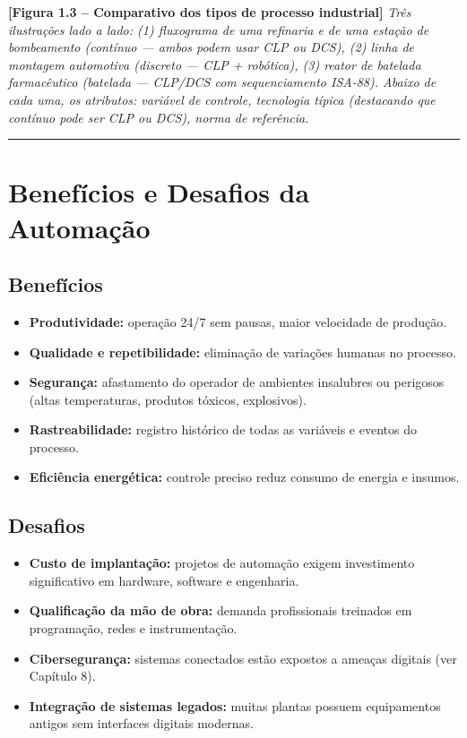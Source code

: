 \begin{caixafigura}

\textbf{{[}Figura 1.3 -- Comparativo dos tipos de processo industrial{]}}
\emph{Três ilustrações lado a lado: (1) fluxograma de uma refinaria e de uma estação de bombeamento (contínuo --- ambos podem usar CLP ou DCS), (2) linha de montagem automotiva (discreto --- CLP + robótica), (3) reator de batelada farmacêutico (batelada --- CLP/DCS com sequenciamento ISA-88). Abaixo de cada uma, os atributos: variável de controle, tecnologia típica (destacando que contínuo pode ser CLP ou DCS), norma de referência.}

\end{caixafigura}

\begin{center}\rule{0.5\linewidth}{0.5pt}\end{center}

\section{Benefícios e Desafios da Automação}\label{benefuxedcios-e-desafios-da-automauxe7uxe3o}

\subsection{Benefícios}\label{benefuxedcios}

\begin{itemize}
\tightlist
\item
  \textbf{Produtividade:} operação 24/7 sem pausas, maior velocidade de produção.
\item
  \textbf{Qualidade e repetibilidade:} eliminação de variações humanas no processo.
\item
  \textbf{Segurança:} afastamento do operador de ambientes insalubres ou perigosos (altas temperaturas, produtos tóxicos, explosivos).
\item
  \textbf{Rastreabilidade:} registro histórico de todas as variáveis e eventos do processo.
\item
  \textbf{Eficiência energética:} controle preciso reduz consumo de energia e insumos.
\end{itemize}

\subsection{Desafios}\label{desafios}

\begin{itemize}
\tightlist
\item
  \textbf{Custo de implantação:} projetos de automação exigem investimento significativo em hardware, software e engenharia.
\item
  \textbf{Qualificação da mão de obra:} demanda profissionais treinados em programação, redes e instrumentação.
\item
  \textbf{Cibersegurança:} sistemas conectados estão expostos a ameaças digitais (ver Capítulo 8).
\item
  \textbf{Integração de sistemas legados:} muitas plantas possuem equipamentos antigos sem interfaces digitais modernas.
\end{itemize}

